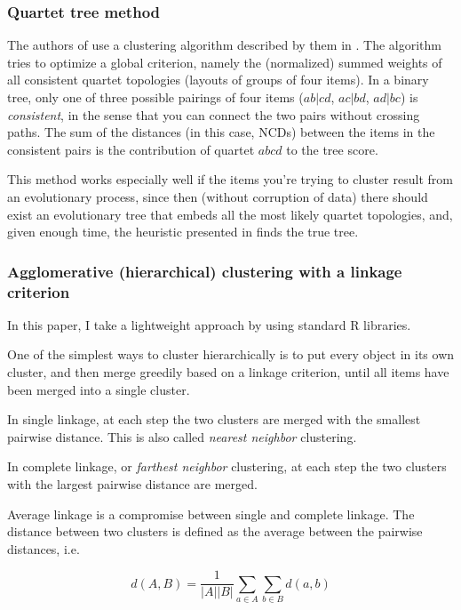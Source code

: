 \subsubsection{Quartet tree method}

The authors of \cite{Cilibrasi2005} use
a clustering algorithm described by them in
\cite{Cilibrasi2011}. The algorithm tries to optimize a global criterion,
namely the (normalized) summed weights of all consistent quartet
topologies (layouts of groups of four items). In a binary tree, only one
of three possible pairings of four items ($ab|cd$, $ac|bd$, $ad|bc$) is
\emph{consistent}, in the sense that you can connect the two pairs without
crossing paths. The sum of the distances (in this case, $\text{NCD}$s)
between the items in the consistent pairs is the contribution of quartet
$abcd$ to the tree score.

This method works especially well if the items you're trying to cluster
result from an evolutionary process, since then (without corruption of
data) there should exist an evolutionary tree that embeds all the most
likely quartet topologies, and, given enough time, the heuristic presented
in \cite{Cilibrasi2011} finds the true tree.

\subsubsection{Agglomerative (hierarchical) clustering with a linkage criterion}

In this paper, I take a lightweight approach by using standard R libraries.

One of the simplest ways to cluster hierarchically is to put every object in its own cluster, and then merge greedily based on a linkage criterion, until all items have been merged into a single cluster.

In single linkage, at each step the two clusters are merged with the smallest pairwise distance. This is also called \emph{nearest neighbor} clustering.

In complete linkage, or \emph{farthest neighbor} clustering, at each step the two clusters with the largest pairwise distance are merged.

Average linkage is a compromise between single and complete linkage. The distance between two clusters is defined as the average between the pairwise distances, i.e.

$$ d(A, B) = \frac{1}{|A||B|} \sum_{a \in A}\sum_{b \in B} d(a, b) $$

